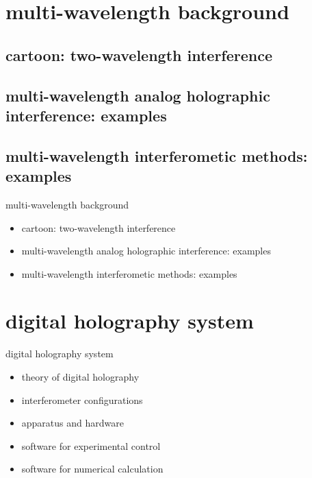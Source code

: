 \documentclass[t, aspectratio=169]{beamer}
\begin{document}
\section{multi-wavelength background}
\begin{frame}{\secname}
	\tableofcontents[currentsection, hideothersubsections, sectionstyle=show/show]
\end{frame}

\subsection{cartoon: two-wavelength interference}
\subsection{multi-wavelength analog holographic interference: examples}
\subsection{multi-wavelength interferometic methods: examples}

\begin{frame}{multi-wavelength background}
	\begin{itemize}
		\item cartoon: two-wavelength interference
		\item multi-wavelength analog holographic interference: examples
		\item multi-wavelength interferometic methods: examples
	\end{itemize}
\end{frame}


\section{digital holography system}

\begin{frame}{digital holography system}
	\begin{itemize}
		\item theory of digital holography
		\item interferometer configurations
		\item apparatus and hardware
		\item software for experimental control
		\item software for numerical calculation
	\end{itemize}
\end{frame}
\end{document}
